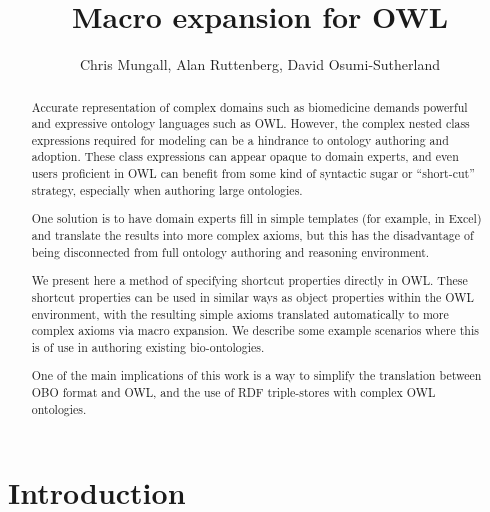 \documentclass{llncs}
\begin{document}
%
\frontmatter          %

\title{Macro expansion for OWL}

\author{Chris Mungall, Alan Ruttenberg, David Osumi-Sutherland}


\maketitle              %

\begin{abstract}

Accurate representation of complex domains such as biomedicine demands
powerful and expressive ontology languages such as OWL. However, the
complex nested class expressions required for modeling can be a
hindrance to ontology authoring and adoption. These class expressions
can appear opaque to domain experts, and even users proficient in OWL
can benefit from some kind of syntactic sugar or ``short-cut''
strategy, especially when authoring large ontologies.

One solution is to have domain experts fill in simple templates (for
example, in Excel) and translate the results into more complex axioms,
but this has the disadvantage of being disconnected from full ontology
authoring and reasoning environment.

We present here a method of specifying shortcut properties directly in
OWL. These shortcut properties can be used in similar ways as object
properties within the OWL environment, with the resulting simple
axioms translated automatically to more complex axioms via macro
expansion. We describe some example scenarios where this is of use in
authoring existing bio-ontologies.

One of the main implications of this work is a way to simplify the
translation between OBO format and OWL, and the use of RDF
triple-stores with complex OWL ontologies.

\end{abstract}

\section{Introduction}
\end{document}
